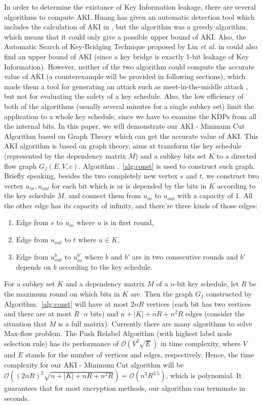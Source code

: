 \begin{bigabstract}
In order to determine the existance of Key Information leakage, there are several algorithms to compute AKI.
Huang has given an automatic detection tool which includes the calculation of AKI in , but the algorithm was a greedy algorithm, which means that it could only give a possible upper bound of AKI.
Also, the Automatic Search of Key-Bridging Technique proposed by Lin \emph{et al.} in  could also find an upper bound of AKI (since a key bridge is exactly 1-bit leakage of Key Information).
However, neither of the two algorithm could compute the accurate value of AKI (a counterexample will be provided in following sections), which made them a tool for generating an attack such as meet-in-the-middle attack , but not for evaluating the safety of a key schedule.
Also, the low efficiency of both of the algorithms (usually several minutes for a single subkey set) limit the application to a whole key schedule, since we have to examine the KDPs from all the internal bits.
In this paper, we will demonstrate our AKI - Minimum Cut Algorithm based on Graph Theory which can get the accurate value of AKI.
This AKI algorithm is based on graph theory, aims at transform the key schedule (represented by the dependency matrix $M$) and a subkey bits set $K$ to a directed flow graph $G_f(E,V,c)$.
Algorithm .~\ref{alg:const} is used to construct such graph.
Briefly speaking, besides the two completely new vertex $s$ and $t$, we construct two vertex $u_{in},u_{out}$ for each bit which is or is depended by the bits in $K$ according to the key schedule $M$, and connect them from $u_{in}$ to $u_{out}$ with a capacity of 1.
All the other edge has its capacity of infinity, and there're three kinds of those edges:
\begin{enumerate}
    \item Edge from $s$ to $u_{in}$ where $u$ is in first round,
    \item Edge from $u_{out}$ to $t$ where $u\in K$,
    \item Edge from $u^{b}_{out}$ to $u^{b'}_{in}$ where $b$ and $b'$ are in two consecutive rounds and $b'$ depends on $b$ according to the key schedule.
\end{enumerate}

For a subkey set $K$ and a dependency matrix $M$ of a $n$-bit key schedule, let $R$ be the maximum round on which bits in $K$ are.
Then the graph $G_f$ constructed by Algorithm.~\ref{alg:const} will have at most $2nR$ vertices (each bit has two vertices and there are at most $R\cdot n$ bits) and $n+|K|+nR+n^2R$ edges (consider the situation that $M$ is a full matrix).
Currently there are many algorithms to solve Max-flow problem. The Push Relabel Algorithm (with highest label node selection rule) has its performance of $\mathcal{O}(V^2\sqrt{E})$ in time complexity, where $V$ and $E$ stands for the number of vertices and edges, respectively.
Hence, the time complexity for our AKI - Minimum Cut algorithm will be $\mathcal{O}((2nR)^2\sqrt{n+|K|+nR+n^2R})=\mathcal{O}(n^3R^{2.5})$, which is polynomial.
It guarantees that for most encryption methods, our algorithm can terminate in seconds.


\end{bigabstract}
